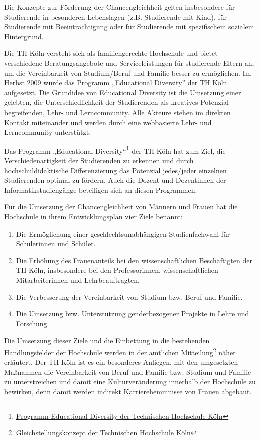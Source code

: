 Die Konzepte zur Förderung der Chancengleichheit gelten insbesondere für
Studierende in besonderen Lebenslagen (z.B. Studierende mit Kind), für
Studierende mit Beeinträchtigung oder für Studierende mit spezifischem
sozialem Hintergrund.

Die TH Köln versteht sich als familiengerechte Hochschule und bietet
verschiedene Beratungsangebote und Serviceleistungen für studierende
Eltern an, um die Vereinbarkeit von Studium/Beruf und Familie besser zu
ermöglichen. Im Herbst 2009 wurde das Programm „Educational Diversity''
der TH Köln aufgesetzt. Die Grundidee von Educational Diversity ist die
Umsetzung einer gelebten, die Unterschiedlichkeit der Studierenden als
kreatives Potenzial begreifenden, Lehr- und Lerncommunity. Alle Akteure
stehen im direkten Kontakt miteinander und werden durch eine webbasierte
Lehr- und Lerncommunity unterstützt.

Das Programm „Educational Diversity``\footnote{\href{https://www.th-koeln.de/hochschule/educational-diversity_5710.php}{Programm
  Educational Diversity der Technischen Hochschule Köln}} der TH Köln
hat zum Ziel, die Verschiedenartigkeit der Studierenden zu erkennen und
durch hochschuldidaktische Differenzierung das Potenzial jedes/jeder
einzelnen Studierenden optimal zu fördern. Auch die Dozent und
Dozentinnen der Informatikstudiengänge beteiligen sich an diesen
Programmen.

Für die Umsetzung der Chancengleichheit von Männern und Frauen hat die
Hochschule in ihrem Entwicklungsplan vier Ziele benannt:

\begin{enumerate}
\def\labelenumi{\arabic{enumi}.}
\tightlist
\item
  Die Ermöglichung einer geschlechtsunabhängigen Studienfachwahl für
  Schülerinnen und Schüler.
\item
  Die Erhöhung des Frauenanteils bei den wissenschaftlichen
  Beschäftigten der TH Köln, insbesondere bei den Professorinnen,
  wissenschaftlichen Mitarbeiterinnen und Lehrbeauftragten.
\item
  Die Verbesserung der Vereinbarkeit von Studium bzw. Beruf und Familie.
\item
  Die Umsetzung bzw. Unterstützung genderbezogener Projekte in Lehre und
  Forschung.
\end{enumerate}

Die Umsetzung dieser Ziele und die Einbettung in die bestehenden
Handlungsfelder der Hochschule werden in der amtlichen
Mitteilung\footnote{\href{http://www.fh-koeln.de/mam/downloads/deutsch/hochschule/profil/gleichstellung/gleichstellungskonzept.pdf}{Gleichstellungskonzept
  der Technischen Hochschule Köln}} näher erläutert. Der TH Köln ist es
ein besonderes Anliegen, mit den umgesetzten Maßnahmen die Vereinbarkeit
von Beruf und Familie bzw. Studium und Familie zu unterstreichen und
damit eine Kulturveränderung innerhalb der Hochschule zu bewirken, denn
damit werden indirekt Karrierehemmnisse von Frauen abgebaut.

